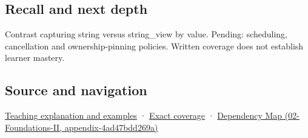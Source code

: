\subsection{Recall and next depth}\label{appendix-aea529eb5175-recall-and-next-depth}

Contrast capturing string versus string\_view by value. Pending: scheduling, cancellation and ownership-pinning policies. Written coverage does not establish learner mastery.

\subsection{Source and navigation}\label{appendix-aea529eb5175-source-and-navigation}

\hyperref[01-foundations-i-ch003-borrowed-views-and-deferred-work-need-an-owner-story]{Teaching explanation and examples} · \hyperref[appendix-fd090d982a15-m008---parts-113-126]{Exact coverage} · \href{../02-Foundations-II/main.pdf\#nameddest=appendix-4ad47bdd269a}{Dependency Map (02-Foundations-II, appendix-4ad47bdd269a)}
